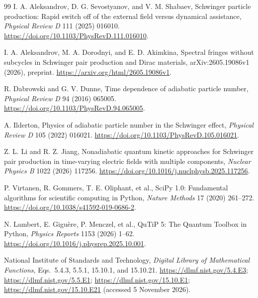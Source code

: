 \documentclass[11pt,a4paper]{article}
\begin{document}
\begin{thebibliography}{99}
I. A. Aleksandrov, D. G. Sevostyanov, and V. M. Shabaev, Schwinger particle production: Rapid switch off of the external field versus dynamical assistance, \textit{Physical Review D} 111 (2025) 016010. \url{https://doi.org/10.1103/PhysRevD.111.016010}.

I. A. Aleksandrov, M. A. Dorodnyi, and E. D. Akimkina, Spectral fringes without subcycles in Schwinger pair production and Dirac materials, arXiv:2605.19086v1 (2026), preprint. \url{https://arxiv.org/html/2605.19086v1}.

R. Dabrowski and G. V. Dunne, Time dependence of adiabatic particle number, \textit{Physical Review D} 94 (2016) 065005. \url{https://doi.org/10.1103/PhysRevD.94.065005}.

A. Ilderton, Physics of adiabatic particle number in the Schwinger effect, \textit{Physical Review D} 105 (2022) 016021. \url{https://doi.org/10.1103/PhysRevD.105.016021}.

Z. L. Li and R. Z. Jiang, Nonadiabatic quantum kinetic approaches for Schwinger pair production in time-varying electric fields with multiple components, \textit{Nuclear Physics B} 1022 (2026) 117256. \url{https://doi.org/10.1016/j.nuclphysb.2025.117256}.

P. Virtanen, R. Gommers, T. E. Oliphant, et al., SciPy 1.0: Fundamental algorithms for scientific computing in Python, \textit{Nature Methods} 17 (2020) 261--272. \url{https://doi.org/10.1038/s41592-019-0686-2}.

N. Lambert, E. Gigu\`ere, P. Menczel, et al., QuTiP 5: The Quantum Toolbox in Python, \textit{Physics Reports} 1153 (2026) 1--62. \url{https://doi.org/10.1016/j.physrep.2025.10.001}.

National Institute of Standards and Technology, \textit{Digital Library of Mathematical Functions}, Eqs.~5.4.3, 5.5.1, 15.10.1, and 15.10.21. \url{https://dlmf.nist.gov/5.4.E3}; \url{https://dlmf.nist.gov/5.5.E1}; \url{https://dlmf.nist.gov/15.10.E1}; \url{https://dlmf.nist.gov/15.10.E21} (accessed 5 November 2026).

\end{thebibliography}
\end{document}
